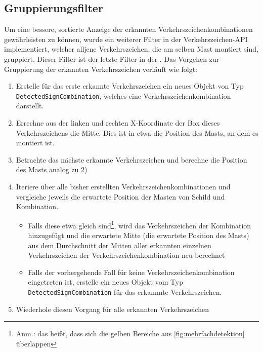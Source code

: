 \documentclass[12pt,a4paper,ngerman,enabledeprecatedfontcommands]{scrreprt}
\begin{document}
\subsection{Gruppierungsfilter}
Um eine bessere, sortierte Anzeige der erkannten \gls{Verkehrszeichenkombination}en gewährleisten zu können, wurde ein weiterer  \gls{Filter} in der \gls{Verkehrszeichen-API} implementiert, welcher alljene Verkehrszeichen, die am selben Mast montiert sind, gruppiert. Dieser Filter ist der letzte \gls{Filter} in der . Das Vorgehen zur Gruppierung der erkannten Verkehrszeichen verläuft wie folgt:
\begin{enumerate}
    \item Erstelle für das erste erkannte Verkehrszeichen ein neues Objekt von Typ \\ \texttt{DetectedSignCombination}, welches eine \gls{Verkehrszeichenkombination} darstellt.
    
    \item Errechne aus der linken und rechten X-Koordinate der Box dieses Verkehrszeichens die Mitte. Dies ist in etwa die Position des Masts, an dem es montiert ist.
    
    \item Betrachte das nächste erkannte Verkehrszeichen und berechne die Position des Masts analog zu 2)
    
    \item Iteriere über alle bisher erstellten Verkehrszeichenkombinationen und vergleiche jeweils die erwartete Position der Masten von Schild und Kombination.
    
    \begin{itemize}
        \item Falls diese etwa gleich sind\footnote{Anm.: das heißt, dass sich die gelben Bereiche aus \cref{fig:mehrfachdetektion} überlappen}, wird das Verkehrszeichen der Kombination hinzugefügt und die erwartete Mitte (die erwartete Position des Masts) aus dem Durchschnitt der Mitten aller erkannten einzelnen Verkehrszeichen der \gls{Verkehrszeichenkombination} neu berechnet
           
        \item Falls der vorhergehende Fall für keine Verkehrszeichenkombination eingetreten ist, erstelle ein neues Objekt vom Typ \\ \texttt{DetectedSignCombination} für das erkannnte Verkehrszeichen.   
    \end{itemize}
    
    \item Wiederhole diesen Vorgang für alle erkannten Verkehrszeichen
\end{enumerate}
\smallskip
\end{document}
